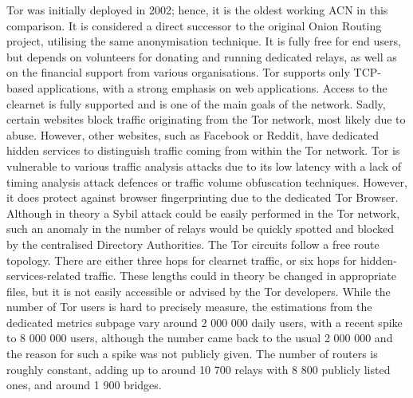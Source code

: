 Tor was initially deployed in 2002; hence, it is the oldest working ACN in this comparison. It is considered a direct successor to the original Onion Routing project, utilising the same anonymisation technique. It is fully free for end users, but depends on volunteers for donating and running dedicated relays, as well as on the financial support from various organisations. Tor supports only TCP-based applications, with a strong emphasis on web applications. Access to the clearnet is fully supported and is one of the main goals of the network. Sadly, certain websites block traffic originating from the Tor network, most likely due to abuse. However, other websites, such as Facebook or Reddit, have dedicated hidden services to distinguish traffic coming from within the Tor network. Tor is vulnerable to various traffic analysis attacks due to its low latency with a lack of timing analysis attack defences or traffic volume obfuscation techniques. However, it does protect against browser fingerprinting due to the dedicated Tor Browser. Although in theory a Sybil attack could be easily performed in the Tor network, such an anomaly in the number of relays would be quickly spotted and blocked by the centralised Directory Authorities. The Tor circuits follow a free route topology. There are either three hops for clearnet traffic, or six hops for hidden-services-related traffic. These lengths could in theory be changed in appropriate files, but it is not easily accessible or advised by the Tor developers. While the number of Tor users is hard to precisely measure, the estimations from the dedicated metrics subpage vary around 2 000 000 daily users, with a recent spike to 8 000 000 users, although the number came back to the usual 2 000 000 and the reason for such a spike was not publicly given. The number of routers is roughly constant, adding up to around 10 700 relays with 8 800 publicly listed ones, and around 1 900 bridges.

